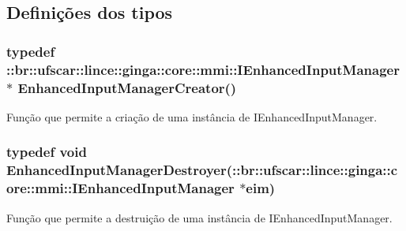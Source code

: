 \subsection{Definições dos tipos}
\subsubsection[{EnhancedInputManagerCreator}]{\setlength{\rightskip}{0pt plus 5cm}typedef ::{\bf br::ufscar::lince::ginga::core::mmi::IEnhancedInputManager}$\ast$ {\bf EnhancedInputManagerCreator}()}\label{IEnhancedInputManager_8h_a0ca98f80db9a7888596b43273cddafc8}
Função que permite a criação de uma instância de IEnhancedInputManager. 
\subsubsection[{EnhancedInputManagerDestroyer}]{\setlength{\rightskip}{0pt plus 5cm}typedef void {\bf EnhancedInputManagerDestroyer}(::{\bf br::ufscar::lince::ginga::core::mmi::IEnhancedInputManager} $\ast$eim)}\label{IEnhancedInputManager_8h_a52a38821641cfd48eb9df9083b522ba6}
Função que permite a destruição de uma instância de IEnhancedInputManager. 
